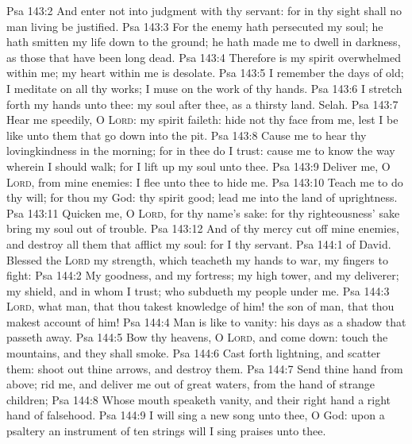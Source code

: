 \vs Psa 143:2 And enter not into judgment with thy servant: for in thy sight shall no man living be justified.
\vs Psa 143:3 For the enemy hath persecuted my soul; he hath smitten my life down to the ground; he hath made me to dwell in darkness, as those that have been long dead.
\vs Psa 143:4 Therefore is my spirit overwhelmed within me; my heart within me is desolate.
\vs Psa 143:5 I remember the days of old; I meditate on all thy works; I muse on the work of thy hands.
\vs Psa 143:6 I stretch forth my hands unto thee: my soul  after thee, as a thirsty land. Selah.
\vs Psa 143:7 Hear me speedily, O \textsc{Lord}: my spirit faileth: hide not thy face from me, lest I be like unto them that go down into the pit.
\vs Psa 143:8 Cause me to hear thy lovingkindness in the morning; for in thee do I trust: cause me to know the way wherein I should walk; for I lift up my soul unto thee.
\vs Psa 143:9 Deliver me, O \textsc{Lord}, from mine enemies: I flee unto thee to hide me.
\vs Psa 143:10 Teach me to do thy will; for thou  my God: thy spirit  good; lead me into the land of uprightness.
\vs Psa 143:11 Quicken me, O \textsc{Lord}, for thy name's sake: for thy righteousness' sake bring my soul out of trouble.
\vs Psa 143:12 And of thy mercy cut off mine enemies, and destroy all them that afflict my soul: for I  thy servant.
\vs Psa 144:1  of David. Blessed  the \textsc{Lord} my strength, which teacheth my hands to war,  my fingers to fight:
\vs Psa 144:2 My goodness, and my fortress; my high tower, and my deliverer; my shield, and  in whom I trust; who subdueth my people under me.
\vs Psa 144:3 \textsc{Lord}, what  man, that thou takest knowledge of him!  the son of man, that thou makest account of him!
\vs Psa 144:4 Man is like to vanity: his days  as a shadow that passeth away.
\vs Psa 144:5 Bow thy heavens, O \textsc{Lord}, and come down: touch the mountains, and they shall smoke.
\vs Psa 144:6 Cast forth lightning, and scatter them: shoot out thine arrows, and destroy them.
\vs Psa 144:7 Send thine hand from above; rid me, and deliver me out of great waters, from the hand of strange children;
\vs Psa 144:8 Whose mouth speaketh vanity, and their right hand  a right hand of falsehood.
\vs Psa 144:9 I will sing a new song unto thee, O God: upon a psaltery  an instrument of ten strings will I sing praises unto thee.
